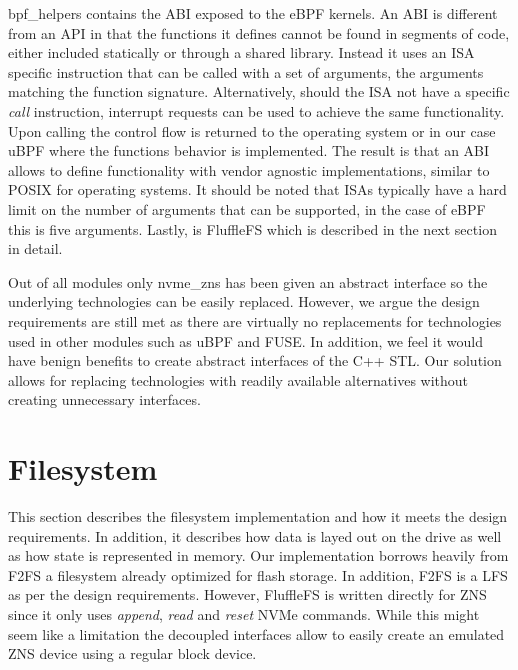 bpf\_helpers contains the ABI exposed to the eBPF kernels. An ABI is different
from an API in that the functions it defines cannot be found in segments of
code, either included statically or through a shared library. Instead it uses
an ISA specific instruction that can be called with a set of arguments, the
arguments matching the function signature. Alternatively, should the ISA not
have a specific \textit{call} instruction, interrupt requests can be used to
achieve the same functionality. Upon calling the control flow is returned to
the operating system or in our case uBPF where the functions behavior is
implemented. The result is that an ABI allows to define functionality with
vendor agnostic implementations, similar to POSIX for operating systems. It
should be noted that ISAs typically have a hard limit on the number of arguments
that can be supported, in the case of eBPF this is five arguments. Lastly, is
FluffleFS which is described in the next section in detail.

\label{module-interfaces}

Out of all modules only nvme\_zns has been given an abstract interface so the
underlying technologies can be easily replaced. However, we argue the design
requirements are still met as there are virtually no replacements for
technologies used in other modules such as uBPF and FUSE\footnotemark[12].
In addition, we feel it would have benign benefits to create abstract
interfaces of the C++ STL. Our solution allows for replacing technologies with
readily available alternatives without creating unnecessary interfaces.


\section{Filesystem}

This section describes the filesystem implementation and how it meets the design
requirements. In addition, it describes how data is layed out on the drive as
well as how state is represented in memory. Our implementation borrows heavily
from F2FS \cite{Lee2015F2FSAN} a filesystem already optimized for flash storage.
In addition, F2FS is a LFS as per the design requirements. However, FluffleFS is
written directly for ZNS since it only uses \textit{append}, \textit{read} and
\textit{reset} NVMe commands. While this might seem like a limitation the
decoupled interfaces allow to easily create an emulated ZNS device using a
regular block device.


